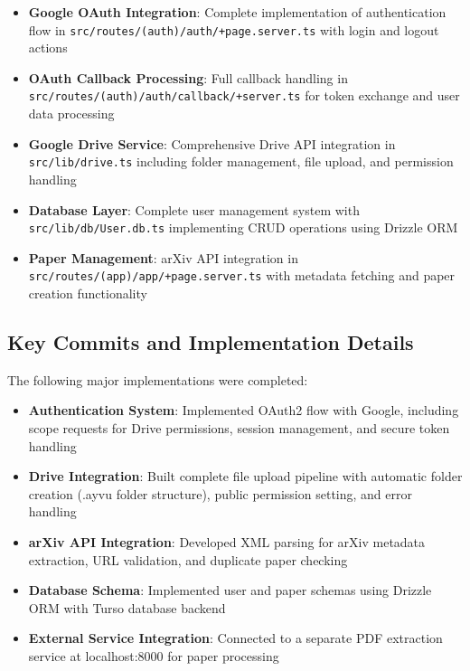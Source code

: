 \documentclass[12pt]{article}
\begin{document}
\begin{itemize}
  \item \textbf{Google OAuth Integration}: Complete implementation of authentication flow in \newline \texttt{src/routes/(auth)/auth/+page.server.ts} with login and logout actions
  \item \textbf{OAuth Callback Processing}: Full callback handling in \newline \texttt{src/routes/(auth)/auth/callback/+server.ts} for token exchange and user data processing
  \item \textbf{Google Drive Service}: Comprehensive Drive API integration in \texttt{src/lib/drive.ts} including folder management, file upload, and permission handling
  \item \textbf{Database Layer}: Complete user management system with \texttt{src/lib/db/User.db.ts} implementing CRUD operations using Drizzle ORM
  \item \textbf{Paper Management}: arXiv API integration in \texttt{src/routes/(app)/app/+page.server.ts} with metadata fetching and paper creation functionality
\end{itemize}

\subsection{Key Commits and Implementation Details}
The following major implementations were completed:

\begin{itemize}
  \item \textbf{Authentication System}: Implemented OAuth2 flow with Google, including scope requests for Drive permissions, session management, and secure token handling
  \item \textbf{Drive Integration}: Built complete file upload pipeline with automatic folder creation (.ayvu folder structure), public permission setting, and error handling
  \item \textbf{arXiv API Integration}: Developed XML parsing for arXiv metadata extraction, URL validation, and duplicate paper checking
  \item \textbf{Database Schema}: Implemented user and paper schemas using Drizzle ORM with Turso database backend
  \item \textbf{External Service Integration}: Connected to a separate PDF extraction service at localhost:8000 for paper processing
\end{itemize}
\end{document}
